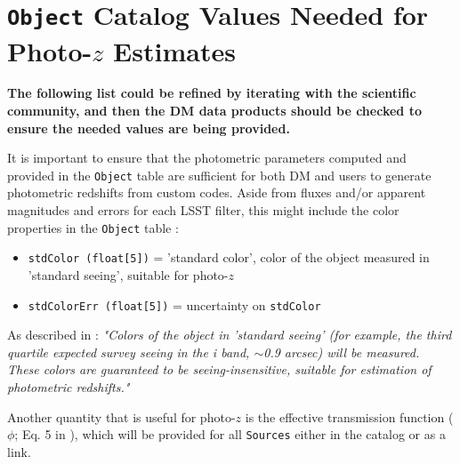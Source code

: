 \documentclass[DM,lsstdraft,toc]{lsstdoc}
\begin{document}
%
%



\clearpage
\section{{\tt Object} Catalog Values Needed for Photo-$z$ Estimates}\label{sec:objvals}

{\bf The following list could be refined by iterating with the scientific community, and then the DM data products should be checked to ensure the needed values are being provided.}

It is important to ensure that the photometric parameters computed and provided in the {\tt Object} table are sufficient for both DM and users to generate photometric redshifts from custom codes.
Aside from fluxes and/or apparent magnitudes and errors for each LSST filter, this might include the color properties in the {\tt Object} table : 

\begin{itemize}[noitemsep,topsep=-10pt]
\item \texttt{stdColor (float[5])} = 'standard color', color of the object measured in 'standard seeing', suitable for photo-$z$
\item \texttt{stdColorErr (float[5])} = uncertainty on \texttt{stdColor}
\end{itemize}

As described in : {\it "Colors of the object in 'standard seeing' (for example, the third quartile expected survey seeing in the i band, $\sim$0.9 arcsec) will be measured. These colors are guaranteed to be seeing-insensitive, suitable for estimation of photometric redshifts."}

Another quantity that is useful for photo-$z$ is the effective transmission function ($\phi$; Eq. 5 in ), which will be provided for all {\tt Sources} either in the catalog or as a link.
\end{document}
